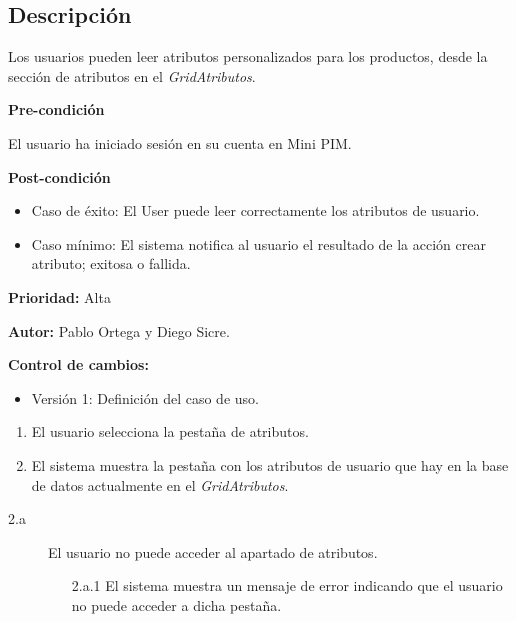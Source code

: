 
\subsection*{Descripción}
Los usuarios pueden leer atributos personalizados para los productos, desde la sección de atributos en el \textit{GridAtributos}.
\vspace{0.15cm}

\textbf{Pre-condición}\par
El usuario ha iniciado sesión en su cuenta en Mini PIM.\par
\vspace{0.15cm}

\textbf{Post-condición}
\begin{itemize}
    \item Caso de éxito: El User puede leer correctamente los atributos de usuario.
    \item Caso mínimo: El sistema notifica al usuario el resultado de la acción crear atributo; exitosa o fallida.
\end{itemize}

\textbf{Prioridad: }
Alta
\vspace{0.15cm}

\textbf{Autor: }
Pablo Ortega y Diego Sicre.\par
\vspace{0.15cm}

\textbf{Control de cambios: }
\begin{itemize}
    \item Versión 1: Definición del caso de uso.
\end{itemize}

\begin{enumerate}
    \item El usuario selecciona la pestaña de atributos.
    \item El sistema muestra la pestaña con los atributos de usuario que hay en la base de datos actualmente en el \textit{GridAtributos}.
\end{enumerate}

\begin{description}
    \item[2.a] El usuario no puede acceder al apartado de atributos.
    \begin{enumerate}
        \item[2.a.1] El sistema muestra un mensaje de error indicando que el usuario no puede acceder a dicha pestaña.
    \end{enumerate}
\end{description}

